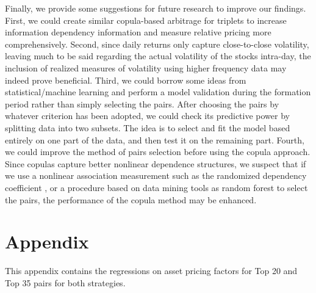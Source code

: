 \documentclass[a4paper,12pt]{report}
\begin{document}
Finally, we provide some suggestions for future research to improve our findings. First, we could create similar copula-based arbitrage for triplets to increase information dependency information and measure relative pricing more comprehensively. Second, since daily returns only capture close-to-close volatility, leaving much to be said regarding the actual volatility of the stocks intra-day, the inclusion of realized measures of volatility using higher frequency data may indeed prove beneficial. Third, we could borrow some ideas from statistical/machine learning and perform a model validation during the formation period rather than simply selecting the pairs. After choosing the pairs by whatever criterion has been adopted, we could check its predictive power by splitting data into two subsets. The idea is to select and fit the model based entirely on one part of the data, and then test it on the remaining part. Fourth, we could improve the method of pairs selection before using the copula approach. Since copulas capture better nonlinear dependence structures, we suspect that if we use a nonlinear association measurement such as the randomized dependency coefficient \citep{lopez2013randomized}, or a procedure based on data mining tools as random forest \citep{dlrz10} to select the pairs, the performance of the copula method may be enhanced. 

	
	
	
	\newpage
	
	\section*{Appendix}
	\vspace{0.6cm}
	
	
This appendix contains the regressions on asset pricing factors for Top 20 and Top 35 pairs for both strategies.
\end{document}

